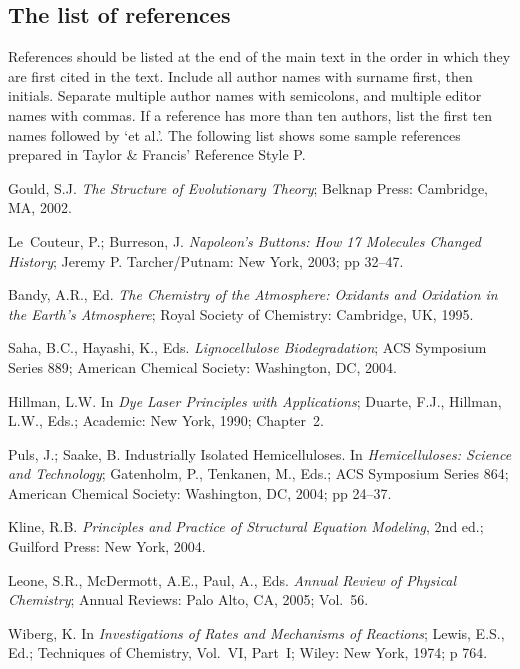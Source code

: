 \documentclass[]{interact}
\theoremstyle{plain}%
\theoremstyle{definition}
\theoremstyle{remark}
\begin{document}
\subsection{The list of references}

References should be listed at the end of the main text in the order in which they are first cited in the text. Include all author names with surname first, then initials. Separate multiple author names with semicolons, and multiple editor names with commas. If a reference has more than ten authors, list the first ten names followed by `et al.'. The following list shows some sample references prepared in Taylor \& Francis' Reference Style P.

\begin{thebibliography}{99}

Gould, S.J. \emph{The Structure of Evolutionary Theory}; Belknap Press:
  Cambridge, MA, 2002.

Le~Couteur, P.; Burreson, J. \emph{Napoleon's Buttons: How 17 Molecules Changed
  History}; Jeremy P. Tarcher/Putnam: New York, 2003; pp 32--47.

Bandy, A.R., Ed. \emph{The Chemistry of the Atmosphere: Oxidants and Oxidation
  in the Earth's Atmosphere}; Royal Society of Chemistry: Cambridge, UK, 1995.

Saha, B.C., Hayashi, K., Eds. \emph{Lignocellulose Biodegradation}; ACS
  Symposium Series 889; American Chemical Society: Washington, DC, 2004.

Hillman, L.W. In \emph{Dye Laser Principles with Applications}; Duarte, F.J.,
  Hillman, L.W., Eds.; Academic: New York, 1990; Chapter~2.

Puls, J.; Saake, B. Industrially Isolated Hemicelluloses. In
  \emph{Hemicelluloses: Science and Technology}; Gatenholm, P., Tenkanen, M.,
  Eds.; ACS Symposium Series 864; American Chemical Society: Washington, DC,
  2004; pp 24--37.

Kline, R.B. \emph{Principles and Practice of Structural Equation Modeling}, 2nd
  ed.; Guilford Press: New York, 2004.

Leone, S.R., McDermott, A.E., Paul, A., Eds. \emph{Annual Review of Physical
  Chemistry}; Annual Reviews: Palo Alto, CA, 2005; Vol.~56.

Wiberg, K. In \emph{Investigations of Rates and Mechanisms of Reactions};
  Lewis, E.S., Ed.; Techniques of Chemistry, Vol.~VI, Part~I; Wiley: New York,
  1974; p 764.


\end{thebibliography}
\end{document}
